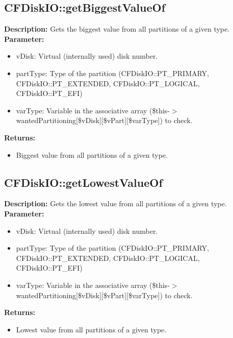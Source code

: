 \subsection{CFDiskIO::getBiggestValueOf}
\textbf{Description:} Gets the biggest value from all partitions of a given type.\\
\textbf{Parameter:}
\begin{itemize}
\item vDisk: Virtual (internally used) disk number.
\item partType: Type of the partition (CFDiskIO::PT\_PRIMARY, CFDiskIO::PT\_EXTENDED, CFDiskIO::PT\_LOGICAL, CFDiskIO::PT\_EFI)
\item varType: Variable in the associative array (\$this-$>$wantedPartitioning[\$vDisk][\$vPart][\$varType]) to check.
\end{itemize}
\textbf{Returns:}
\begin{itemize}
\item Biggest value from all partitions of a given type.
\end{itemize}

\subsection{CFDiskIO::getLowestValueOf}
\textbf{Description:} Gets the lowest value from all partitions of a given type.\\
\textbf{Parameter:}
\begin{itemize}
\item vDisk: Virtual (internally used) disk number.
\item partType: Type of the partition (CFDiskIO::PT\_PRIMARY, CFDiskIO::PT\_EXTENDED, CFDiskIO::PT\_LOGICAL, CFDiskIO::PT\_EFI)
\item varType: Variable in the associative array (\$this-$>$wantedPartitioning[\$vDisk][\$vPart][\$varType]) to check.
\end{itemize}
\textbf{Returns:}
\begin{itemize}
\item Lowest value from all partitions of a given type.
\end{itemize}

